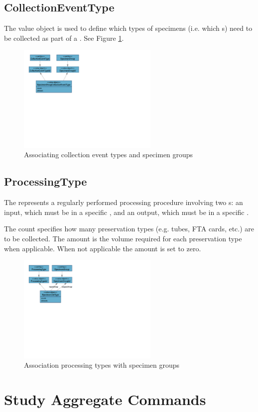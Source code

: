 \subsection{CollectionEventType}
\label{sec:collection-event-type}

The \texttt{\textbf{}} value
object is used to define which types of specimens (i.e. which
s) need to be collected as part of a
. See Figure \ref{fig:collection-event-type}.

\begin{figure}[h]
  \centering
  \includegraphics[trim={9mm 118mm 158mm 9mm}, clip,
    width=0.6\textwidth]{images/collection-event-type}
  \caption{Associating collection event types and specimen groups}
  \label{fig:collection-event-type}
\end{figure}

\subsection{ProcessingType}
\label{sec:Processing-type}

The \texttt{\textbf{}} represents a regularly
performed processing procedure involving two s: an input,
which must be in a specific , and an output, which
must be in a specific .

The count specifies how many preservation types (e.g. tubes, FTA cards, etc.) are to
be collected. The amount is the volume required for each preservation type when
applicable. When not applicable the amount is set to zero.

\begin{figure}[h]
  \centering
  \includegraphics[trim={9mm 120mm 172mm 9mm}, clip,
    width=0.6\textwidth]{images/processing-type}
  \caption{Association processing types with specimen groups}
  \label{fig:processing-type}
\end{figure}

\section {Study Aggregate Commands}
